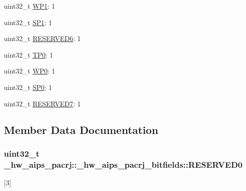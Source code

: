 \begin{DoxyCompactItemize}
\item 
uint32\+\_\+t \hyperlink{struct__hw__aips__pacrj_1_1__hw__aips__pacrj__bitfields_adf0ddb4717cee375c45e0000afc898b7}{W\+P1}\+: 1
\item 
uint32\+\_\+t \hyperlink{struct__hw__aips__pacrj_1_1__hw__aips__pacrj__bitfields_ab9ce1f52734d45dd4835a45a5244318a}{S\+P1}\+: 1
\item 
uint32\+\_\+t \hyperlink{struct__hw__aips__pacrj_1_1__hw__aips__pacrj__bitfields_a165e866d60edaefecee676ed5af8feea}{R\+E\+S\+E\+R\+V\+E\+D6}\+: 1
\item 
uint32\+\_\+t \hyperlink{struct__hw__aips__pacrj_1_1__hw__aips__pacrj__bitfields_ae7f284adcbfa83f63f6be40e54d5415b}{T\+P0}\+: 1
\item 
uint32\+\_\+t \hyperlink{struct__hw__aips__pacrj_1_1__hw__aips__pacrj__bitfields_ad1988e94f8099f91229fcfb599454364}{W\+P0}\+: 1
\item 
uint32\+\_\+t \hyperlink{struct__hw__aips__pacrj_1_1__hw__aips__pacrj__bitfields_aac1d46e807794647f81f41e83bb60e1a}{S\+P0}\+: 1
\item 
uint32\+\_\+t \hyperlink{struct__hw__aips__pacrj_1_1__hw__aips__pacrj__bitfields_a19fa6619062cc6d233d37fb03484296d}{R\+E\+S\+E\+R\+V\+E\+D7}\+: 1
\end{DoxyCompactItemize}


\subsection{Member Data Documentation}
\subsubsection[{\texorpdfstring{R\+E\+S\+E\+R\+V\+E\+D0}{RESERVED0}}]{\setlength{\rightskip}{0pt plus 5cm}uint32\+\_\+t \+\_\+hw\+\_\+aips\+\_\+pacrj\+::\+\_\+hw\+\_\+aips\+\_\+pacrj\+\_\+bitfields\+::\+R\+E\+S\+E\+R\+V\+E\+D0}\hypertarget{struct__hw__aips__pacrj_1_1__hw__aips__pacrj__bitfields_a1e35680abe461503ffffa5291c3cfb2d}{}\label{struct__hw__aips__pacrj_1_1__hw__aips__pacrj__bitfields_a1e35680abe461503ffffa5291c3cfb2d}
\mbox{[}3\mbox{]} 
